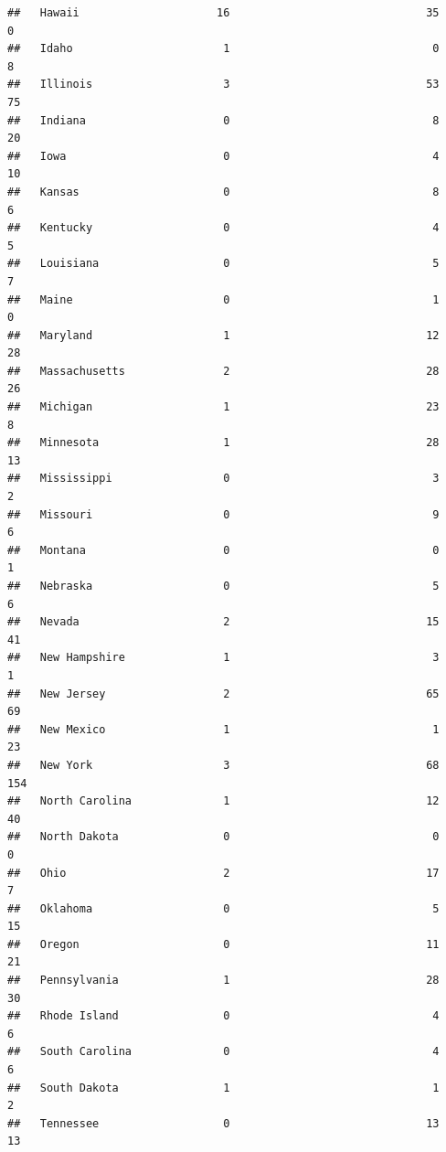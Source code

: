 \documentclass[
]{book}
\theoremstyle{definition}
\theoremstyle{definition}
\theoremstyle{definition}
\theoremstyle{definition}
\theoremstyle{remark}
\begin{document}
\begin{verbatim}
##   Hawaii                     16                              35               0
##   Idaho                       1                               0               8
##   Illinois                    3                              53              75
##   Indiana                     0                               8              20
##   Iowa                        0                               4              10
##   Kansas                      0                               8               6
##   Kentucky                    0                               4               5
##   Louisiana                   0                               5               7
##   Maine                       0                               1               0
##   Maryland                    1                              12              28
##   Massachusetts               2                              28              26
##   Michigan                    1                              23               8
##   Minnesota                   1                              28              13
##   Mississippi                 0                               3               2
##   Missouri                    0                               9               6
##   Montana                     0                               0               1
##   Nebraska                    0                               5               6
##   Nevada                      2                              15              41
##   New Hampshire               1                               3               1
##   New Jersey                  2                              65              69
##   New Mexico                  1                               1              23
##   New York                    3                              68             154
##   North Carolina              1                              12              40
##   North Dakota                0                               0               0
##   Ohio                        2                              17               7
##   Oklahoma                    0                               5              15
##   Oregon                      0                              11              21
##   Pennsylvania                1                              28              30
##   Rhode Island                0                               4               6
##   South Carolina              0                               4               6
##   South Dakota                1                               1               2
##   Tennessee                   0                              13              13

\end{verbatim}
\end{document}
